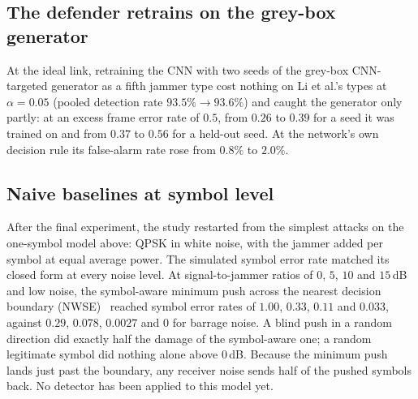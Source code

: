 \subsection{The defender retrains on the grey-box generator}
At the ideal link, retraining the CNN with two seeds of the grey-box CNN-targeted generator as a fifth jammer type cost nothing on Li et al.'s types at $\alpha=0.05$ (pooled detection rate $93.5\%\to93.6\%$) and caught the generator only partly: at an excess frame error rate of $0.5$, from $0.26$ to $0.39$ for a seed it was trained on and from $0.37$ to $0.56$ for a held-out seed.
At the network's own decision rule its false-alarm rate rose from $0.8\%$ to $2.0\%$.

\subsection{Naive baselines at symbol level}
After the final experiment, the study restarted from the simplest attacks on the one-symbol model above: QPSK in white noise, with the jammer added per symbol at equal average power.
The simulated symbol error rate matched its closed form at every noise level.
At signal-to-jammer ratios of $0$, $5$, $10$ and $15$\,dB and low noise, the symbol-aware minimum push across the nearest decision boundary (NWSE)~\cite{xie2022adversarial} reached symbol error rates of $1.00$, $0.33$, $0.11$ and $0.033$, against $0.29$, $0.078$, $0.0027$ and $0$ for barrage noise.
A blind push in a random direction did exactly half the damage of the symbol-aware one; a random legitimate symbol did nothing alone above $0$\,dB.
Because the minimum push lands just past the boundary, any receiver noise sends half of the pushed symbols back.
No detector has been applied to this model yet.
